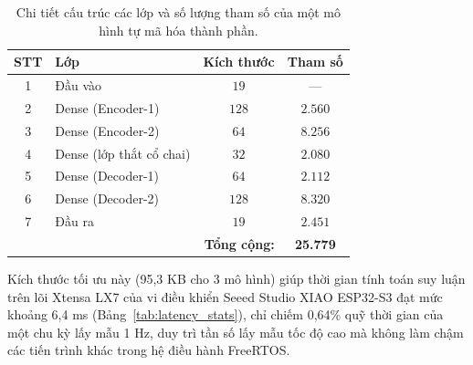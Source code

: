 \begin{table}[H]
    \centering
    \caption[Chi tiết tham số mạng tự mã hóa]{Chi tiết cấu trúc các lớp và số lượng tham số của một mô hình tự mã hóa thành phần.}
    \label{tab:ae_params}
    \begin{tabular}{clcc}
        \hline
        \textbf{STT} & \textbf{Lớp} & \textbf{Kích thước} & \textbf{Tham số} \\
        \hline
        1 & Đầu vào      & $19$    & ---    \\
        2 & Dense (Encoder-1)    & $128$   & $2.560$ \\
        3 & Dense (Encoder-2)    & $64$    & $8.256$ \\
        4 & Dense (lớp thắt cổ chai)   & $32$    & $2.080$ \\
        5 & Dense (Decoder-1)    & $64$    & $2.112$ \\
        6 & Dense (Decoder-2)    & $128$   & $8.320$ \\
        7 & Đầu ra      & $19$    & $2.451$ \\
        \hline
        \multicolumn{3}{r}{\textbf{Tổng cộng:}} & \textbf{25.779} \\
        \hline
    \end{tabular}
\end{table}

Kích thước tối ưu này (95,3 KB cho 3 mô hình) giúp thời gian tính toán suy luận trên lõi Xtensa LX7 của vi điều khiển Seeed Studio XIAO ESP32-S3 đạt mức khoảng 6,4 ms (Bảng~\ref{tab:latency_stats}), chỉ chiếm 0,64\% quỹ thời gian của một chu kỳ lấy mẫu 1 Hz, duy trì tần số lấy mẫu tốc độ cao mà không làm chậm các tiến trình khác trong hệ điều hành FreeRTOS.


